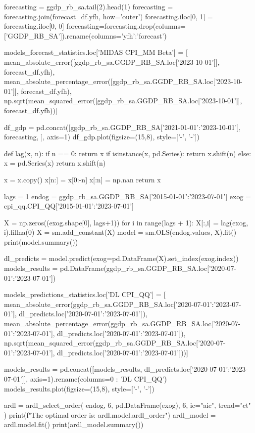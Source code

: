 \documentclass[a4paper, 12pt]{extarticle}
\numberwithin{equation}{subsection}
\begin{document}
\begin{python}
		forecasting = ggdp_rb_sa.tail(2).head(1)
		forecasting = forecasting.join(forecast_df.yfh, how='outer')
		forecasting.iloc[0, 1] = forecasting.iloc[0, 0]
		forecasting=forecasting.drop(columns=['GGDP_RB_SA']).rename(columns={'yfh':'forecast'})
		
		models_forecast_statistics.loc['MIDAS CPI_MM Beta'] = [
		mean_absolute_error([ggdp_rb_sa.GGDP_RB_SA.loc['2023-10-01']], forecast_df.yfh),
		mean_absolute_percentage_error([ggdp_rb_sa.GGDP_RB_SA.loc['2023-10-01']], forecast_df.yfh),
		np.sqrt(mean_squared_error([ggdp_rb_sa.GGDP_RB_SA.loc['2023-10-01']], forecast_df.yfh))]
		
		df_gdp = pd.concat([ggdp_rb_sa.GGDP_RB_SA['2021-01-01':'2023-10-01'], 
		forecasting, ], axis=1)
		df_gdp.plot(figsize=(15,8), style=['-', '-'])
		
		def lag(x, n):
		if n == 0:
		return x
		if isinstance(x, pd.Series):
		return x.shift(n) 
		else:
		x = pd.Series(x)
		return x.shift(n) 
		
		x = x.copy()
		x[n:] = x[0:-n]
		x[:n] = np.nan
		return x
		
		lags = 1
		endog = ggdp_rb_sa.GGDP_RB_SA['2015-01-01':'2023-07-01']
		exog = cpi_qq.CPI_QQ['2015-01-01':'2023-07-01']
		
		X = np.zeros((exog.shape[0], lags+1))
		for i in range(lags + 1):
		X[:,i] = lag(exog, i).fillna(0)
		X = sm.add_constant(X)
		model = sm.OLS(endog.values, X).fit()
		print(model.summary())
		
		dl_predicts = model.predict(exog=pd.DataFrame(X).set_index(exog.index))
		models_results = pd.DataFrame(ggdp_rb_sa.GGDP_RB_SA.loc['2020-07-01':'2023-07-01'])
		
		models_predictions_statistics.loc['DL CPI_QQ'] = [
		mean_absolute_error(ggdp_rb_sa.GGDP_RB_SA.loc['2020-07-01':'2023-07-01'], dl_predicts.loc['2020-07-01':'2023-07-01']),
		mean_absolute_percentage_error(ggdp_rb_sa.GGDP_RB_SA.loc['2020-07-01':'2023-07-01'], dl_predicts.loc['2020-07-01':'2023-07-01']),
		np.sqrt(mean_squared_error(ggdp_rb_sa.GGDP_RB_SA.loc['2020-07-01':'2023-07-01'], dl_predicts.loc['2020-07-01':'2023-07-01']))]
		
		models_results = pd.concat([models_results, dl_predicts.loc['2020-07-01':'2023-07-01']], axis=1).rename(columns={0 : 'DL CPI_QQ'})
		models_results.plot(figsize=(15,8), style=['-', '-'])
		
		ardl = ardl_select_order(
		endog, 6, pd.DataFrame(exog), 6, ic="aic", trend="ct"
		)
		print(f"The optimal order is: {ardl.model.ardl_order}")
		ardl_model = ardl.model.fit()
		print(ardl_model.summary())
		

\end{python}
\end{document}
